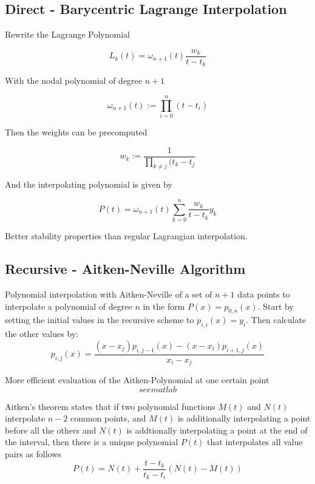 \documentclass[
    a4paper,
    11pt
]{article}
\begin{document}
\subsection{Direct - Barycentric Lagrange Interpolation}

Rewrite the Lagrange Polynomial

\begin{equation}
    L_k(t) = \omega_{n+1}(t) \frac{w_k}{t-t_k}
\end{equation}

With the nodal polynomial of degree $n+1$

\begin{equation}
    \omega_{n+1}(t) := \prod_{i=0}^n (t - t_i)
\end{equation}

Then the weights can be precomputed

\begin{equation}
    w_k := \frac{1}{\prod_{k\neq j} (t_k - t_j}
\end{equation}

And the interpolating polynomial is given by

\begin{equation}
    P(t) = \omega_{n+1}(t) \sum_{k=0}^n \frac{w_k}{t-t_k} y_k
\end{equation}

Better stability properties than regular Lagrangian interpolation.

\subsection{Recursive - Aitken-Neville Algorithm}

Polynomial interpolation with Aitken-Neville of a set of $n+1$ data points to
interpolate a polynomial of degree $n$ in the form $P(x) = p_{0,n}(x)$. Start by
setting the initial values in the recursive scheme to $p_{i,i}(x)=y_i$. Then
calculate the other values by:
\begin{equation}
    p_{i,j}(x) = \frac{(x-x_j)p_{i,j-1}(x) - (x-x_i)p_{i+1,j}(x)}{x_i - x_j}
\end{equation}

More efficient evaluation of the Aitken-Polynomial at one certain point
\begin{equation}
    see matlab
\end{equation}

Aitken's theorem states that if two polynomial functions $M(t)$ and $N(t)$
interpolate $n-2$ common points, and $M(t)$ is additionally interpolating a
point before all the others and $N(t)$ is addtionally interpolating a point at
the end of the interval, then there is a unique polynomial $P(t)$ that
interpolates all value pairs as follows
\begin{equation}
    P(t) = N(t) + \frac{t - t_k}{t_k - t_i} (N(t) - M(t))
\end{equation}
\end{document}
